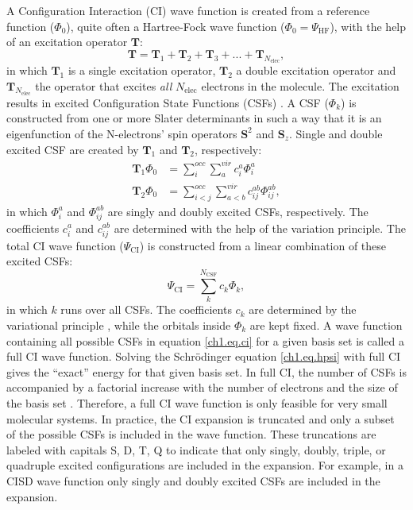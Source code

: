 A Configuration Interaction (CI) wave function is created from a reference function ($\Phi_0$), quite often a Hartree-Fock wave function ($\Phi_0 = \Psi_\mathrm{HF}$), with the help of an excitation operator $\mathbf{T}$:
\begin{equation}
\mathbf{T}=\mathbf{T}_1 + \mathbf{T}_2 + \mathbf{T}_3 + ... + \mathbf{T}_{N_{\mathrm{elec}}},
\label{ch1.eq.ciexcitation}
\end{equation}
in which $\mathbf{T}_1$ is a single excitation operator, $\mathbf{T}_2$ a double excitation operator and $\mathbf{T}_{N_{\mathrm{elec}}}$ the operator that excites \textit{all} $N_{\mathrm{elec}}$ electrons in the molecule. The excitation results in excited Configuration State Functions (CSFs) \cite{shavitt1,shavitt2}. A CSF ($\Phi_k$) is constructed from one or more Slater determinants in such a way that it is an eigenfunction of the N-electrons' spin operators $\mathbf{S}^2$ and $\mathbf{S}_z$. Single and double excited CSF are created by $\mathbf{T}_1$ and $\mathbf{T}_2$, respectively:
\begin{equation}
\begin{split}
\mathbf{T}_1 \Phi_0 & = \sum_i^{occ} \sum_a^{vir} c_i^a \Phi_i^a \\
\mathbf{T}_2 \Phi_0 & = \sum_{i<j}^{occ} \sum_{a<b}^{vir} c_{ij}^{ab} \Phi_{ij}^{ab},
\end{split}
\label{ch1.eq.ciexcited}
\end{equation}
in which $\Phi_i^a$ and $\Phi_{ij}^{ab}$ are singly and doubly excited CSFs, respectively. The coefficients $c_i^a$ and $c_{ij}^{ab}$ are determined with the help of the variation principle. The total CI wave function ($\Psi_{\mathrm{CI}}$) is constructed from a linear combination of these excited CSFs:
\begin{equation}
\Psi_{\mathrm{CI}} = \sum_{k}^{N_{\mathrm{CSF}}} c_k \Phi_k,
\label{ch1.eq.ci}
\end{equation}
in which $k$ runs over all CSFs. The coefficients $c_k$ are determined by the variational principle \cite{varia}, while the orbitals inside $\Phi_k$ are kept fixed. A wave function containing all possible CSFs in equation \ref{ch1.eq.ci} for a given basis set is called a full CI wave function. Solving the Schr\"{o}dinger equation \ref{ch1.eq.hpsi} with full CI gives the ``exact'' energy for that given basis set. In full CI, the number of CSFs is accompanied by a factorial increase with the number of electrons and the size of the basis set \cite{weyl}. Therefore, a full CI wave function is only feasible for very small molecular systems. In practice, the CI expansion is truncated and only a subset of the possible CSFs is included in the wave function. These truncations are labeled with capitals S, D, T, Q to indicate that only singly, doubly, triple, or quadruple excited configurations are included in the expansion. For example, in a CISD wave function only singly and doubly excited CSFs are included in the expansion.

